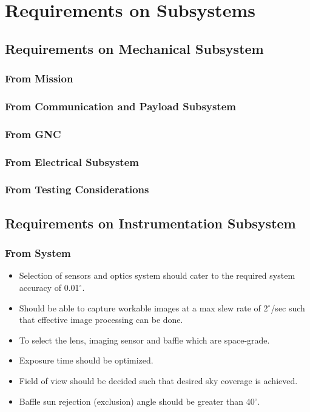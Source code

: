 \chapter{Requirements on Subsystems}
\thispagestyle{fancy}

\section{Requirements on Mechanical Subsystem}
\subsection{From Mission}
\subsection{From Communication and Payload Subsystem} 
\subsection{From GNC} 
\subsection{From Electrical Subsystem}
\subsection {From Testing Considerations} 


\newpage
\section{Requirements on Instrumentation Subsystem}
\subsection{From System}
\begin{itemize}
    \item Selection of sensors and optics system should cater to the required system accuracy of 0.01$^{\circ}$.
    \item Should be able to capture workable images at a max slew rate of 2$^{\circ}$/sec such that effective image processing can be done.
    \item To select the lens, imaging sensor and baffle which are space-grade.
    \item Exposure time should be optimized.
    \item Field of view should be decided such that desired sky coverage is achieved.
    \item Baffle sun rejection (exclusion) angle should be greater than 40$^{\circ}$.
\end{itemize}
